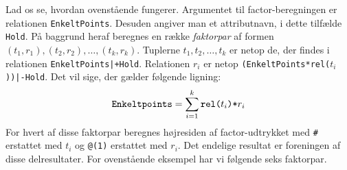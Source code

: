 
Lad os se, hvordan ovenst\aa{}ende fungerer. Argumentet til factor-be\-reg\-ning\-en
er relationen \verb"EnkeltPoints". Desuden angiver man et attributnavn, i dette
tilf\ae{}lde \verb"Hold". P\aa{} baggrund heraf beregnes en r\ae{}kke {\em faktorpar} af
formen $(t_1,r_1),(t_2,r_2),\ldots,(t_k,r_k)$. Tuplerne 
$t_1,t_2,\ldots,t_k$ er netop de, der findes i relationen
\verb"EnkeltPoints|+Hold". Relationen $r_i$ er netop
\verb"(EnkeltPoints*rel("$t_i$\verb"))|-Hold". Det vil sige, der g\ae{}lder
f\o{}lgende ligning:
$$\mbox{\tt Enkeltpoints} = \sum_{i=1}^k \mbox{\tt rel(}t_i\mbox{\tt )*}r_i$$ 
For hvert af disse faktorpar beregnes h\o{}jresiden af factor-udtrykket med
\verb"#" erstattet med $t_i$ og \verb"@(1)" erstattet med $r_i$. Det
endelige resultat er foreningen af disse delresultater. For ovenst\aa{}ende
eksempel har vi f\o{}lgende seks faktorpar.

